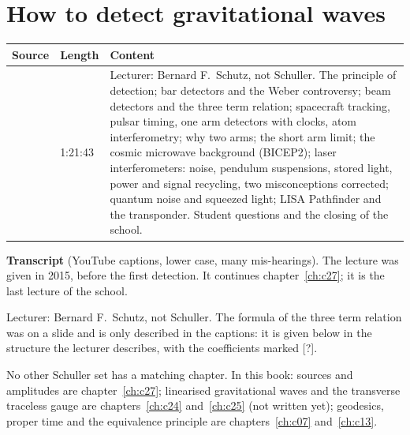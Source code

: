 \chapter{How to detect gravitational waves}\label{ch:c28}
\begin{paracol}{2}

\begin{sources}
\begin{tabularx}{\linewidth}{@{}l l L@{}}
\toprule
\textbf{Source} & \textbf{Length} & \textbf{Content}\\
\midrule
{} & 1:21:43 & Lecturer: Bernard F.\ Schutz, not Schuller. The principle of detection; bar detectors and the Weber controversy; beam detectors and the three term relation; spacecraft tracking, pulsar timing, one arm detectors with clocks, atom interferometry; why two arms; the short arm limit; the cosmic microwave background (BICEP2); laser interferometers: noise, pendulum suspensions, stored light, power and signal recycling, two misconceptions corrected; quantum noise and squeezed light; LISA Pathfinder and the transponder. Student questions and the closing of the school.\\
\bottomrule
\end{tabularx}

\smallskip
\textbf{Transcript}  (YouTube captions, lower case, many mis-hearings). The lecture was given in 2015, before the first detection. It continues chapter~\ref{ch:c27}; it is the last lecture of the school.
\end{sources}

\begin{coursenote}[Lecturer]
Lecturer: Bernard F.\ Schutz, not Schuller. The formula of the three term relation was on a slide and is only described in the captions: it is given below in the structure the lecturer describes, with the coefficients marked [?].
\end{coursenote}

\begin{reading}
No other Schuller set has a matching chapter. In this book: sources and amplitudes are chapter~\ref{ch:c27}; linearised gravitational waves and the transverse traceless gauge are chapters~\ref{ch:c24} and~\ref{ch:c25} (not written yet); geodesics, proper time and the equivalence principle are chapters~\ref{ch:c07} and~\ref{ch:c13}.
\end{reading}


\end{paracol}
